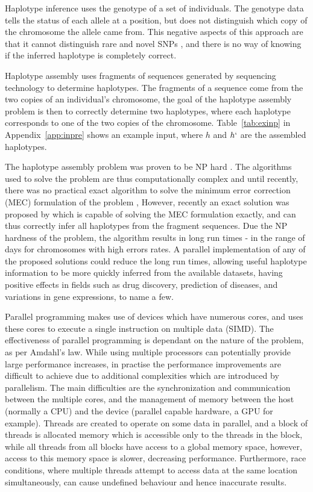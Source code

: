 \documentclass[10pt,a4paer,twocolumn]{article}
\begin{document}
Haplotype inference uses the genotype of a set of individuals. The genotype data tells the status of each
allele at a position, but does not distinguish which copy of the chromosome the allele came from.
This negative aspects of this approach are that it cannot distinguish rare and novel SNPs \cite{he:2010}, 
and there is no way of knowing if the inferred haplotype is completely correct. 

Haplotype assembly uses fragments of sequences generated by sequencing technology to determine
haplotypes. The fragments of a sequence come from the two copies of an individual's chromosome, the goal of the
haplotype assembly problem is then to correctly determine two haplotypes, where each haplotype corresponds to
one of the two copies of the chromosome. Table~\ref{tab:exinp} in Appendix~\ref{app:inpre} shows an example
input, where $h$ and $h`$ are the assembled haplotypes. 

The haplotype assembly problem was proven to be NP hard \cite{lippert:2002}. The algorithms used to solve the
problem are thus computationally complex and until recently, there was no practical exact algorithm to solve 
the minimum error correction (MEC) formulation of the problem \cite{bonizzoni:2003},
However, recently an exact solution was proposed by \cite{chen:2013} which is capable of solving the MEC 
formulation exactly, and can thus correctly infer all haplotypes from the fragment sequences. Due the NP hardness 
of the problem, the algorithm results in long run times - in the range of days for chromosomes with high
errors rates. A parallel implementation of any of the proposed solutions could reduce the long run
times, allowing useful haplotype information to be more quickly inferred from the available datasets, having
positive effects in fields such as drug discovery, prediction of diseases, and variations in gene
expressions, to name a few. 

Parallel programming makes use of devices which have numerous cores, and uses these cores to execute a single
instruction on multiple data (SIMD). The effectiveness of parallel programming is dependant on the nature of 
the problem, as per Amdahl's law. While using multiple processors can potentially provide large performance 
increases, in practise the performance improvements are difficult to achieve due to additional complexities 
which are introduced by parallelism. The main difficulties are the synchronization and communication between 
the multiple cores, and the management of memory between the host (normally a CPU) and the device (parallel
capable hardware, a GPU for example). Threads are created to operate on some data in parallel, and a block of
threads is allocated memory which is accessible only to the threads in the block, while all threads from all
blocks have access  to a global memory space, however, access to this  memory space is slower, decreasing 
performance. Furthermore, race conditions, where multiple threads attempt to access data at the same location 
simultaneously, can cause undefined behaviour and hence inaccurate results.
\end{document}
